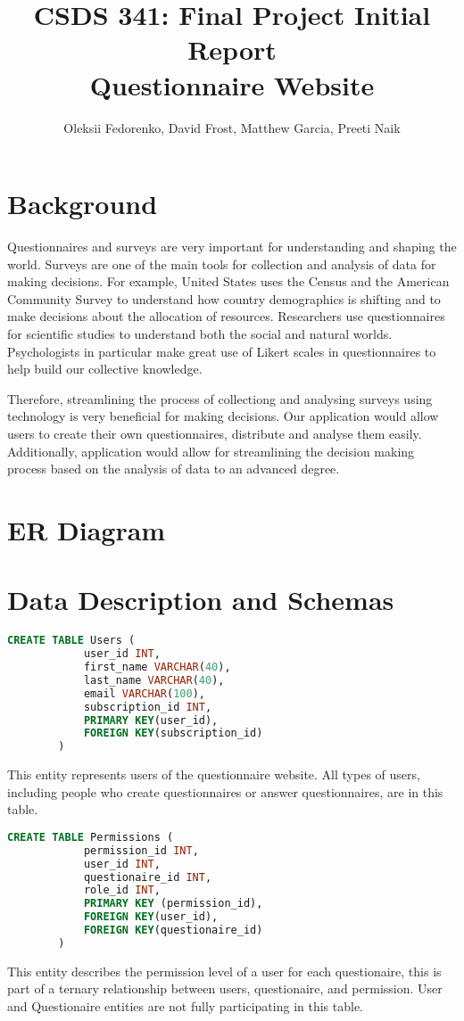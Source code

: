 \documentclass[12pt, oneside, a4paper]{article}
\title{CSDS 341: Final Project Initial Report\\ Questionnaire Website}
\author{Oleksii Fedorenko, David Frost, Matthew Garcia, Preeti Naik}
\begin{document}
    \maketitle
    \section{Background}
    Questionnaires and surveys are very important for understanding and shaping the world. Surveys are one of the main tools for collection and analysis of data for making decisions. For example, United States uses the Census and the American Community Survey to understand how country demographics is shifting and to make decisions about the allocation of resources. Researchers use questionnaires for scientific studies to understand both the social and natural worlds. Psychologists in particular make great use of Likert scales in questionnaires to help build our collective knowledge.
    
    Therefore, streamlining the process of collectiong and analysing surveys using technology is very beneficial for making decisions. Our application would allow users to create their own questionnaires, distribute and analyse them easily. Additionally, application would allow for streamlining the decision making process based on the analysis of data to an advanced degree.
    

    \newpage    
    \section{ER Diagram}


    \newpage
    \section{Data Description and Schemas}
    \begin{lstlisting}[language=SQL, columns=flexible]
        CREATE TABLE Users (
            user_id INT,
            first_name VARCHAR(40),
            last_name VARCHAR(40),
            email VARCHAR(100),
            subscription_id INT, 
            PRIMARY KEY(user_id),
            FOREIGN KEY(subscription_id)
        ) 
    \end{lstlisting}
    This entity represents users of the questionnaire website.
    All types of users, including people who create questionnaires
    or answer questionnaires, are in this table.
    \\

    \begin{lstlisting}[language=SQL, columns=flexible]
        CREATE TABLE Permissions (
            permission_id INT,
            user_id INT,
            questionaire_id INT,
            role_id INT,
            PRIMARY KEY (permission_id),
            FOREIGN KEY(user_id),
            FOREIGN KEY(questionaire_id)
        ) 
    \end{lstlisting}
    This entity describes the permission level of a user for each 
    questionaire, this is part of a ternary relationship between users, questionaire, and permission. User and Questionaire entities are not fully participating in this table. 
    \\
    
\end{document}
